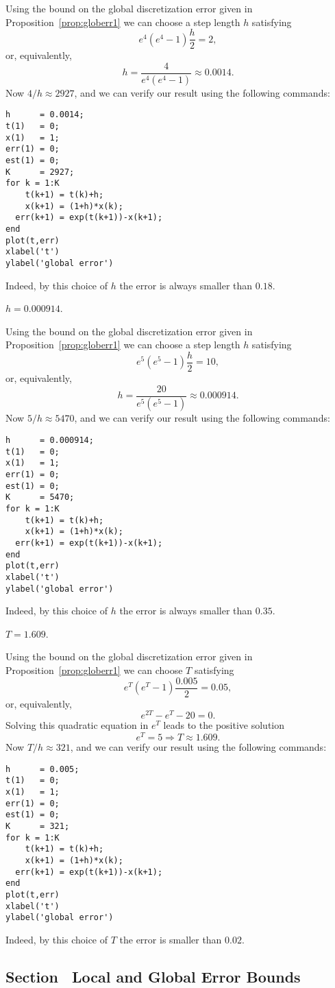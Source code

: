 \soln Using the bound on the global discretization error
given in Proposition~\ref{prop:globerr1} we can choose a
step length $h$ satisfying
\[
e^4(e^4-1)\frac{h}{2} = 2,
\]
or, equivalently,
\[
h = \frac{4}{e^4(e^4-1)} \approx 0.0014.
\]
Now $4/h \approx 2927$, and we can verify our result using the
following \Matlab commands:
\begin{verbatim}
h      = 0.0014;
t(1)   = 0;
x(1)   = 1;
err(1) = 0;
est(1) = 0;
K      = 2927;
for k = 1:K
    t(k+1) = t(k)+h;
    x(k+1) = (1+h)*x(k);
  err(k+1) = exp(t(k+1))-x(k+1);
end
plot(t,err)
xlabel('t')
ylabel('global error')
\end{verbatim}
Indeed, by this choice of $h$ the error is always smaller than $0.18$.


 \ans $h=0.000914$.

\soln Using the bound on the global discretization error
given in Proposition~\ref{prop:globerr1} we can choose a
step length $h$ satisfying
\[
e^{5}(e^{5}-1)\frac{h}{2} = 10,
\]
or, equivalently,
\[
h = \frac{20}{e^{5}(e^{5}-1)} \approx 0.000914.
\]
Now $5/h \approx 5470$, and we can verify our result using the
following \Matlab commands:
\begin{verbatim}
h      = 0.000914;
t(1)   = 0;
x(1)   = 1;
err(1) = 0;
est(1) = 0;
K      = 5470;
for k = 1:K
    t(k+1) = t(k)+h;
    x(k+1) = (1+h)*x(k);
  err(k+1) = exp(t(k+1))-x(k+1);
end
plot(t,err)
xlabel('t')
ylabel('global error')
\end{verbatim}
Indeed, by this choice of $h$ the error is always smaller than $0.35$.


 \ans $T=1.609$.

\soln Using the bound on the global discretization error
given in Proposition~\ref{prop:globerr1} we can choose
$T$ satisfying
\[
e^{T}(e^{T}-1)\frac{0.005}{2} = 0.05,
\]
or, equivalently,
\[
e^{2T} - e^T - 20 = 0.
\]
Solving this quadratic equation in $e^T$ leads to the positive
solution
\[
e^T = 5 \Rightarrow T \approx 1.609.
\]
Now $T/h \approx 321$, and we can verify our result using the
following \Matlab commands:
\begin{verbatim}
h      = 0.005;
t(1)   = 0;
x(1)   = 1;
err(1) = 0;
est(1) = 0;
K      = 321;
for k = 1:K
    t(k+1) = t(k)+h;
    x(k+1) = (1+h)*x(k);
  err(k+1) = exp(t(k+1))-x(k+1);
end
plot(t,err)
xlabel('t')
ylabel('global error')
\end{verbatim}
Indeed, by this choice of $T$ the error is smaller than $0.02$.


\subsection*{Section~\protect{\ref{sec:LGEE}} Local and Global Error Bounds}


